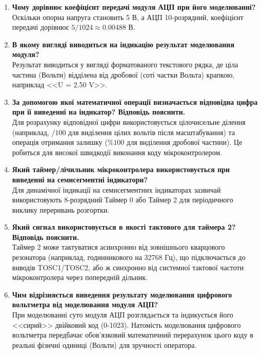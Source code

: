 \documentclass[14pt, a4paper]{extreport}
\begin{document}
\begin{enumerate}
		\item \textbf{Чому дорівнює коефіцієнт передачі модуля АЦП при його моделюванні?} \\ Оскільки опорна напруга становить 5 В, а АЦП 10-розрядний, коефіцієнт передачі дорівнює $5 / 1024 \approx 0.00488$ В.
		
		\item \textbf{В якому вигляді виводиться на індикацію результат моделювання модуля?} \\ Результат виводиться у вигляді форматованого текстового рядка, де ціла частина (Вольти) відділена від дробової (соті частки Вольта) крапкою, наприклад <<U = 2.50 V>>.
		
		\item \textbf{За допомогою якої математичної операції визначається відповідна цифра при її виведенні на індикатор? Відповідь пояснити.} \\ Для розрахунку відповідної цифри використовується цілочисельне ділення (наприклад, $/ 100$ для виділення цілих вольтів після масштабування) та операція отримання залишку ($\% 100$ для виділення дробової частини). Це робиться для високої швидкодії виконання коду мікроконтролером.
		
		\item \textbf{Який таймер/лічильник мікроконтролера використовується при виведенні на семисегментні індикатори?} \\ Для динамічної індикації на семисегментних індикаторах зазвичай використовують 8-розрядний Таймер 0 або Таймер 2 для періодичного виклику переривань розгортки.
		
		\item \textbf{Який сигнал використовується в якості тактового для таймера 2? Відповідь пояснити.} \\ Таймер 2 може тактуватися асинхронно від зовнішнього кварцового резонатора (наприклад, годинникового на 32768 Гц), що підключається до виводів TOSC1/TOSC2, або ж синхронно від системної тактової частоти мікроконтролера через попередній дільник.
		
		\item \textbf{Чим відрізняється виведення результату моделювання цифрового вольтметра від моделювання модуля АЦП?} \\ При моделюванні суто модуля АЦП розглядається та індикується його <<сирий>> двійковий код (0-1023). Натомість моделювання цифрового вольтметра передбачає обов'язковий математичний перерахунок цього коду в реальні фізичні одиниці (Вольти) для зручності оператора.
	\end{enumerate}
	
\end{document}
